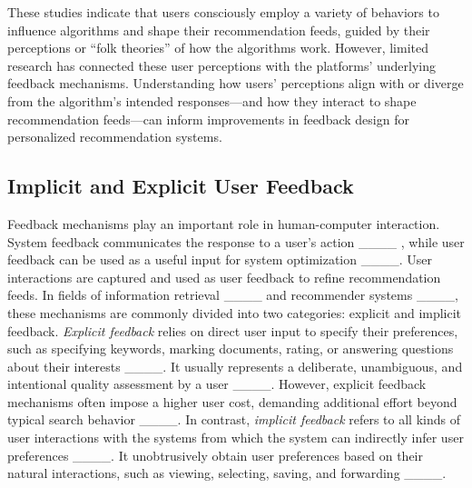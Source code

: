 These studies indicate that users consciously employ a variety of behaviors to influence algorithms and shape their recommendation feeds, guided by their perceptions or ``folk theories'' of how the algorithms work. However, limited research has connected these user perceptions with the platforms' underlying feedback mechanisms. Understanding how users' perceptions align with or diverge from the algorithm's intended responses---and how they interact to shape recommendation feeds---can inform improvements in feedback design for personalized recommendation systems.

\subsection{Implicit and Explicit User Feedback}
Feedback mechanisms play an important role in human-computer interaction. System feedback communicates the response to a user's action ____ , while user feedback can be used as a useful input for system optimization ____.  User interactions are captured and used as user feedback to refine recommendation feeds. In fields of information retrieval ____ and recommender systems ____, these mechanisms are commonly divided into two categories: explicit and implicit feedback. \textit{Explicit feedback} relies on direct user input to specify their preferences, such as specifying keywords, marking documents, rating, or answering questions about their interests ____. It usually represents a deliberate, unambiguous, and intentional quality assessment by a user ____. However, explicit feedback mechanisms often impose a higher user cost, demanding additional effort beyond typical search behavior ____. In contrast, \textit{implicit feedback} refers to all kinds of user interactions with the systems from which the system can indirectly infer user preferences ____. It unobtrusively obtain user preferences based on their natural interactions, such as viewing, selecting, saving, and forwarding ____. 

